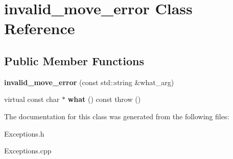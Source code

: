 \hypertarget{classinvalid__move__error}{
\section{invalid\_\-move\_\-error Class Reference}
\label{classinvalid__move__error}
}
\subsection*{Public Member Functions}
\begin{DoxyCompactItemize}
\item 
\hypertarget{classinvalid__move__error_adc9a651482c3b4469a2798eb2c382d46}{
{\bfseries invalid\_\-move\_\-error} (const std::string \&what\_\-arg)}
\label{classinvalid__move__error_adc9a651482c3b4469a2798eb2c382d46}

\item 
\hypertarget{classinvalid__move__error_ac91c3fcf1ac791269ae1b6eb0aa5603d}{
virtual const char $\ast$ {\bfseries what} () const   throw ()}
\label{classinvalid__move__error_ac91c3fcf1ac791269ae1b6eb0aa5603d}

\end{DoxyCompactItemize}


The documentation for this class was generated from the following files:\begin{DoxyCompactItemize}
\item 
Exceptions.h\item 
Exceptions.cpp\end{DoxyCompactItemize}

